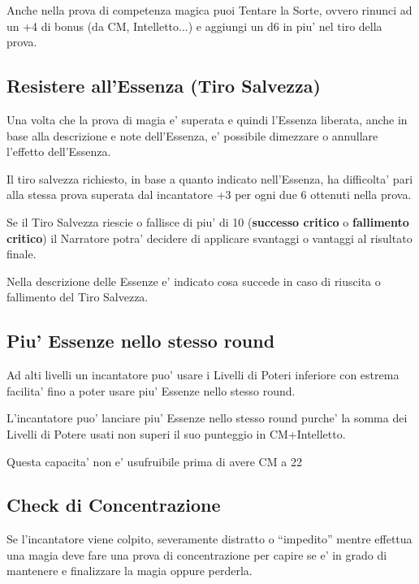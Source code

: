 \documentclass[a4paper,11pt,twoside,openany]{dndbook}
\begin{document}
Anche nella prova di competenza magica puoi Tentare la Sorte, ovvero rinunci ad un +4 di bonus (da CM, Intelletto...) e aggiungi un d6 in piu' nel tiro della prova.

\subsection{Resistere all'Essenza (Tiro Salvezza)}

\label{resistere-allessenza-tiro-salvezza}

Una volta che la prova di magia e' superata e quindi l'Essenza liberata, anche in base alla descrizione e note dell'Essenza, e' possibile dimezzare o annullare l'effetto dell'Essenza.

Il tiro salvezza richiesto, in base a quanto indicato nell'Essenza, ha difficolta' pari alla stessa prova superata dal incantatore +3 per ogni due 6 ottenuti nella prova.

Se il Tiro Salvezza riescie o fallisce di piu' di 10 (\textbf{successo critico} o \textbf{fallimento critico}) il Narratore potra' decidere di applicare svantaggi o vantaggi al risultato finale.

Nella descrizione delle Essenze e' indicato cosa succede in caso di riuscita o fallimento del Tiro Salvezza.

\subsection{Piu' Essenze nello stesso round}

Ad alti livelli un incantatore puo' usare i Livelli di Poteri inferiore con estrema facilita' fino a poter usare piu' Essenze nello stesso round.

L'incantatore puo' lanciare piu' Essenze nello stesso round purche' la somma dei Livelli di Potere usati non superi il suo punteggio in CM+Intelletto.

Questa capacita' non e' usufruibile prima di avere CM a 22

\subsection{Check di Concentrazione}

Se l'incantatore viene colpito, severamente distratto o ``impedito'' mentre effettua una magia deve fare una prova di concentrazione per capire se e' in grado di mantenere e finalizzare la magia oppure perderla.
\end{document}
